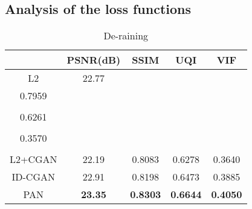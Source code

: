 \documentclass{article}
\begin{document}
\subsection{Analysis of the loss functions}

\begin{table}[!t]
\renewcommand{\arraystretch}{1.5}
\caption{De-raining}
\label{table:deraining}
\centering
\begin{tabular}{|c|c|c|c|c|}
\hline
  & PSNR(dB) & SSIM & UQI & VIF \\
\hline
\hline
 L2 & 22.77 & \\0.7959 \\ & \\0.6261 \\&  \\0.3570 \\ \\
\hline
 L2+CGAN & 22.19 & 0.8083 & 0.6278 & 0.3640 \\
\hline
 ID-CGAN & 22.91 & 0.8198 & 0.6473 & 0.3885\\
\hline
 PAN & {\bf 23.35} & {\bf 0.8303} & {\bf 0.6644} & {\bf 0.4050}\\
\hline
\end{tabular}
\end{table}
\end{document}
